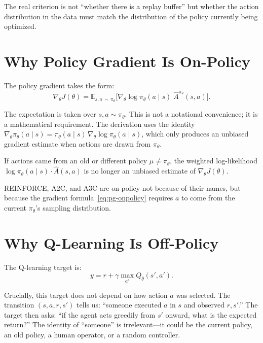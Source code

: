 The real criterion is not ``whether there is a replay buffer'' but whether the action distribution in the data must match the distribution of the policy currently being optimized.

\section{Why Policy Gradient Is On-Policy}
\label{sec:pg-on}

The policy gradient takes the form:
\begin{equation}
  \nabla_\theta J(\theta)
  = \mathbb{E}_{s,a \,\sim\, \pi_\theta}\!\bigl[
      \nabla_\theta \log\pi_\theta(a \mid s)\;\hat{A}^{\pi_\theta}(s,a)
    \bigr].
  \label{eq:pg-onpolicy}
\end{equation}

The expectation is taken over $s, a \sim \pi_\theta$. This is not a notational convenience; it is a mathematical requirement. The derivation uses the identity $\nabla_\theta \pi_\theta(a \mid s) = \pi_\theta(a \mid s)\,\nabla_\theta\log\pi_\theta(a \mid s)$, which only produces an unbiased gradient estimate when actions are drawn from $\pi_\theta$.

If actions came from an old or different policy $\mu \neq \pi_\theta$, the weighted log-likelihood $\log\pi_\theta(a \mid s)\cdot\hat{A}(s,a)$ is no longer an unbiased estimate of $\nabla_\theta J(\theta)$.

\begin{keyidea}
REINFORCE, A2C, and A3C are on-policy not because of their names, but because the gradient formula~\eqref{eq:pg-onpolicy} requires $a$ to come from the current $\pi_\theta$'s sampling distribution.
\end{keyidea}

\section{Why Q-Learning Is Off-Policy}
\label{sec:ql-off}

The Q-learning target is:
\begin{equation}
  y = r + \gamma \max_{a'} Q_{\bar\theta}(s', a').
  \label{eq:ql-target}
\end{equation}

Crucially, this target does not depend on how action $a$ was selected. The transition $(s, a, r, s')$ tells us: ``someone executed $a$ in $s$ and observed $r, s'$.'' The target then asks: ``if the agent acts greedily from $s'$ onward, what is the expected return?'' The identity of ``someone'' is irrelevant---it could be the current policy, an old policy, a human operator, or a random controller.

